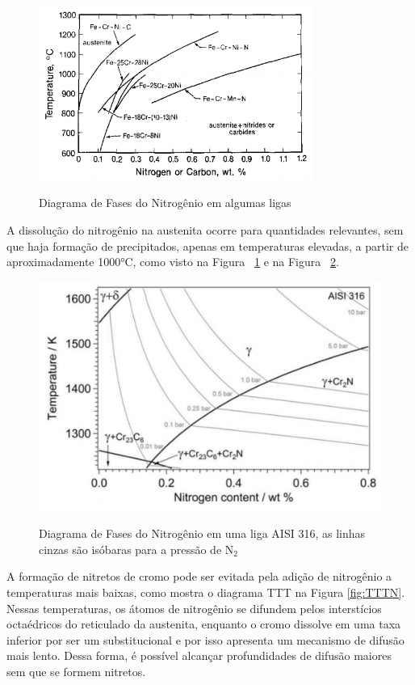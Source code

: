 \documentclass[]{politex}
\begin{document}
	\begin{figure}[ht]
	\caption{Diagrama de Fases do Nitrogênio em algumas ligas}
	\includegraphics[width=0.8\textwidth]{solubN}
	\label{fig:diagrN}
	\centering
	\end{figure}
	
	A dissolução do nitrogênio na austenita ocorre para quantidades relevantes, sem que haja formação de precipitados, apenas em temperaturas elevadas, a partir de aproximadamente 1000°C, como visto na Figura ~\ref{fig:diagrN} e na Figura ~\ref{fig:diagramaN}.\par
	
	\begin{figure}[ht]
	\caption{Diagrama de Fases do Nitrogênio em uma liga AISI 316, as linhas cinzas são isóbaras para a pressão de N$_{2}$}
	\includegraphics{diagramaN}
	\label{fig:diagramaN}
	\centering
	\end{figure}
	
	A formação de nitretos de cromo pode ser evitada pela adição de nitrogênio a temperaturas mais baixas, como mostra o diagrama TTT na Figura \ref{fig:TTTN}. Nessas temperaturas, os átomos de nitrogênio se difundem pelos interstícios octaédricos do reticulado da austenita, enquanto o cromo dissolve em uma taxa inferior por ser um substitucional e por isso apresenta um mecanismo de difusão mais lento. Dessa forma, é possível alcançar profundidades de difusão maiores sem que se formem nitretos.\par
\end{document}

